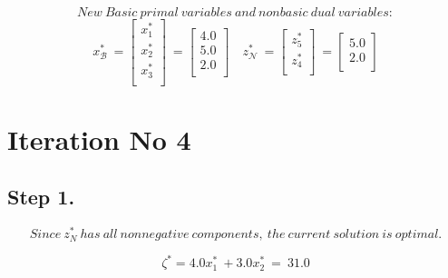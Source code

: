 \documentclass [12pt] {article}
\begin{document}
\[
New\ Basic\ primal\ variables\ and\ nonbasic\ dual\ variables:
\]
\[
x_{\mathcal B}^{*}\ =\begin{bmatrix}
x_{1}^{*} \\x_{2}^{*} \\x_{3}^{*} \\
\end{bmatrix}\ =\begin{bmatrix}
4.0 \\ 5.0 \\ 2.0 \\ 
\end{bmatrix}\quad
z_{\mathcal N}^{*}\ =\begin{bmatrix}
z_{5}^{*} \\z_{4}^{*} \\
\end{bmatrix}\ =\begin{bmatrix}
5.0 \\ 2.0 \\ 
\end{bmatrix}
\]
\section*{Iteration No 4}
\subsection{Step 1.}
\[
Since\ z_\mathit{N}^*\ has\ all\ nonnegative\ components,\ the\ current\ solution\ is\ optimal.
\]

\[
\zeta^{*} = 4.0x_{1}^{*}\ +3.0x_{2}^{*}\ =\ 31.0
\]
 
\end{document}
